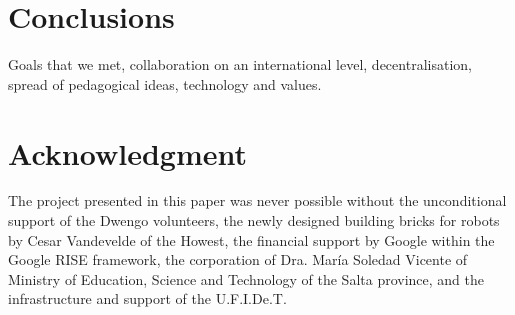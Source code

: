 \documentclass[a4paper]{llncs}
\begin{document}
\section{Conclusions}
Goals that we met, collaboration on an international level, decentralisation, spread of pedagogical ideas, technology and values.


\section*{Acknowledgment}
The project presented in this paper was never possible without the unconditional support of the Dwengo volunteers, the newly designed building bricks for robots by Cesar Vandevelde of the Howest, the financial support by Google within the Google RISE framework, the corporation of Dra. Mar\'ia Soledad Vicente of Ministry of Education, Science and Technology of the Salta province, and the infrastructure and support of the U.F.I.De.T.



\end{document}
